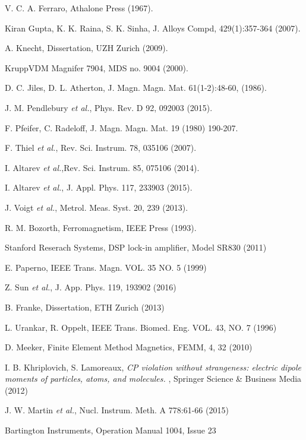 \documentclass[review]{elsarticle}
\begin{document}
\begin{thebibliography}{00}
 V. C. A. Ferraro, Athalone Press (1967).

 Kiran Gupta, K. K. Raina, S. K. Sinha, J. Alloys Compd, 429(1):357-364 (2007).

 A. Knecht, Dissertation, UZH Zurich (2009).

 KruppVDM Magnifer 7904, MDS no. 9004 (2000).

 D. C. Jiles, D. L. Atherton,  J. Magn. Magn. Mat. 61(1-2):48-60, (1986).

 J. M. Pendlebury {\it et al.}, Phys. Rev. D 92, 092003 (2015).

 F. Pfeifer, C. Radeloff, J. Magn. Magn. Mat. 19 (1980) 190-207.

 F. Thiel {\it et al.}, Rev. Sci. Instrum. 78, 035106 (2007).

 I. Altarev {\it et al.},Rev. Sci. Instrum. 85, 075106 (2014).

 I. Altarev {\it et al.}, J. Appl. Phys. 117, 233903 (2015).

 J. Voigt {\it et al.}, Metrol. Meas. Syst. 20, 239 (2013).

 R. M. Bozorth, Ferromagnetism, IEEE Press (1993).

 Stanford Reserach Systems, DSP lock-in amplifier, Model SR830 (2011)

 E. Paperno, IEEE Trans. Magn. VOL. 35 NO. 5 (1999)

 Z. Sun {\it et al.}, J. App. Phys. 119, 193902 (2016)

 B. Franke, Dissertation, ETH Zurich (2013)

 L. Urankar, R. Oppelt, IEEE Trans. Biomed. Eng. VOL. 43, NO. 7 (1996) 

 D. Meeker, Finite Element Method Magnetics, FEMM, 4, 32 (2010)

 I. B. Khriplovich,
  S. Lamoreaux, { \it CP violation without strangeness: electric
    dipole moments of particles, atoms, and molecules. }, Springer
  Science \& Business Media (2012)

 J. W. Martin {\it et al.}, Nucl. Instrum. Meth. A 778:61-66 (2015) 

 Bartington Instruments, Operation Manual 1004, Issue 23
\end{thebibliography}
\end{document}
